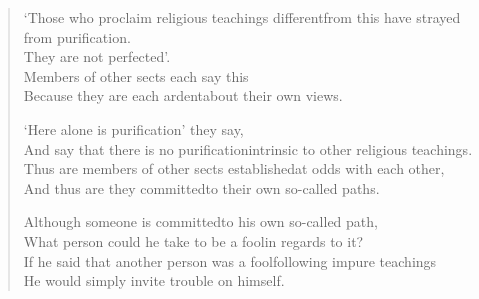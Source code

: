 \begin{verse}

 `Those who proclaim religious teachings different\newline from this have strayed from purification.\\
They are not perfected'.\\
Members of other sects each say this\\
Because they are each ardent\newline about their own views.


 `Here alone is purification' they say,\\
And say that there is no purification\newline intrinsic to other religious teachings.\\
Thus are members of other sects established\newline at odds with each other,\\
And thus are they committed\newline to their own so-called paths.


 Although someone is committed\newline to his own so-called path,\\
What person could he take to be a fool\newline in regards to it?\\
If he said that another person was a fool\newline following impure teachings\\
He would simply invite trouble on himself.



\end{verse}
